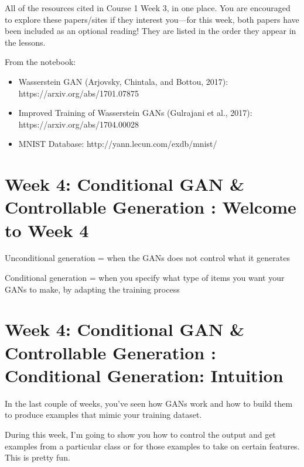 \documentclass[11pt, onecolumn]{article}
\begin{document}
All of the resources cited in Course 1 Week 3, in one place.  You are encouraged to explore these papers/sites if they interest you—for this week, both papers have been included as an optional reading! They are listed in the order they appear in the lessons.

From the notebook:
\begin{itemize}
\item Wasserstein GAN (Arjovsky, Chintala, and Bottou, 2017): https://arxiv.org/abs/1701.07875
\item Improved Training of Wasserstein GANs (Gulrajani et al., 2017): https://arxiv.org/abs/1704.00028
\item MNIST Database: http://yann.lecun.com/exdb/mnist/
\end{itemize}



\section{Week 4: Conditional GAN \& Controllable Generation : Welcome to Week 4}

Unconditional generation = when the GANs does not control what it generates

Conditional generation = when you specify what type of items you want your GANs to make, by adapting the training process

\section{Week 4: Conditional GAN \& Controllable Generation : Conditional Generation: Intuition}

In the last couple of weeks, you've seen how GANs work and how to build them to produce examples that mimic your training dataset.

During this week, I'm going to show you how to control the output and get examples from a particular class or for those examples to take on certain features. This is pretty fun.
\end{document}
